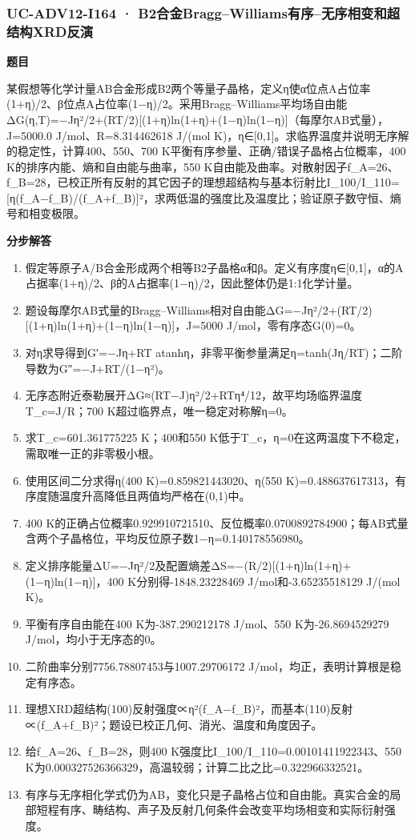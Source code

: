 \documentclass[UTF8,11pt,a4paper]{ctexart}
\begin{document}
\subsubsection*{UC-ADV12-I164 · B2合金Bragg–Williams有序–无序相变和超结构XRD反演}
\noindent\textbf{题目}\par
某假想等化学计量AB合金形成B2两个等量子晶格，定义η使α位点A占位率(1+η)/2、β位点A占位率(1−η)/2。采用Bragg–Williams平均场自由能ΔG(η,T)=−Jη²/2+(RT/2)[(1+η)ln(1+η)+(1−η)ln(1−η)]（每摩尔AB式量），J=5000.0 J/mol、R=8.314462618 J/(mol K)，η∈[0,1]。求临界温度并说明无序解的稳定性，计算400、550、700 K平衡有序参量、正确/错误子晶格占位概率，400 K的排序内能、熵和自由能与曲率，550 K自由能及曲率。对散射因子f\_A=26、f\_B=28，已校正所有反射的其它因子的理想超结构与基本衍射比I\_100/I\_110=[η(f\_A−f\_B)/(f\_A+f\_B)]²，求两低温的强度比及温度比；验证原子数守恒、熵号和相变极限。\par
\medskip\noindent\textbf{分步解答}
\begin{enumerate}
\item 假定等原子A/B合金形成两个相等B2子晶格α和β。定义有序度η∈[0,1]，α的A占据率(1+η)/2、β的A占据率(1−η)/2，因此整体仍是1:1化学计量。
\item 题设每摩尔AB式量的Bragg–Williams相对自由能ΔG=−Jη²/2+(RT/2)[(1+η)ln(1+η)+(1−η)ln(1−η)]，J=5000 J/mol，零有序态G(0)=0。
\item 对η求导得到G′=−Jη+RT atanhη，非零平衡参量满足η=tanh(Jη/RT)；二阶导数为G″=−J+RT/(1−η²)。
\item 无序态附近泰勒展开ΔG≈(RT−J)η²/2+RTη⁴/12，故平均场临界温度T\_c=J/R；700 K超过临界点，唯一稳定对称解η=0。
\item 求T\_c=601.361775225 K；400和550 K低于T\_c，η=0在这两温度下不稳定，需取唯一正的非零极小根。
\item 使用区间二分求得η(400 K)=0.859821443020、η(550 K)=0.488637617313，有序度随温度升高降低且两值均严格在(0,1)中。
\item 400 K的正确占位概率0.929910721510、反位概率0.0700892784900；每AB式量含两个子晶格位，平均反位原子数1−η=0.140178556980。
\item 定义排序能量ΔU=−Jη²/2及配置熵差ΔS=−(R/2)[(1+η)ln(1+η)+(1−η)ln(1−η)]，400 K分别得-1848.23228469 J/mol和-3.65235518129 J/(mol K)。
\item 平衡有序自由能在400 K为-387.290212178 J/mol、550 K为-26.8694529279 J/mol，均小于无序态的0。
\item 二阶曲率分别7756.78807453与1007.29706172 J/mol，均正，表明计算根是稳定有序态。
\item 理想XRD超结构(100)反射强度∝η²(f\_A−f\_B)²，而基本(110)反射∝(f\_A+f\_B)²；题设已校正几何、消光、温度和角度因子。
\item 给f\_A=26、f\_B=28，则400 K强度比I\_100/I\_110=0.00101411922343、550 K为0.000327526366329，高温较弱；计算二比之比=0.322966332521。
\item 有序与无序相化学式仍为AB，变化只是子晶格占位和自由能。真实合金的局部短程有序、畴结构、声子及反射几何条件会改变平均场相变和实际衍射强度。
\end{enumerate}
\end{document}
